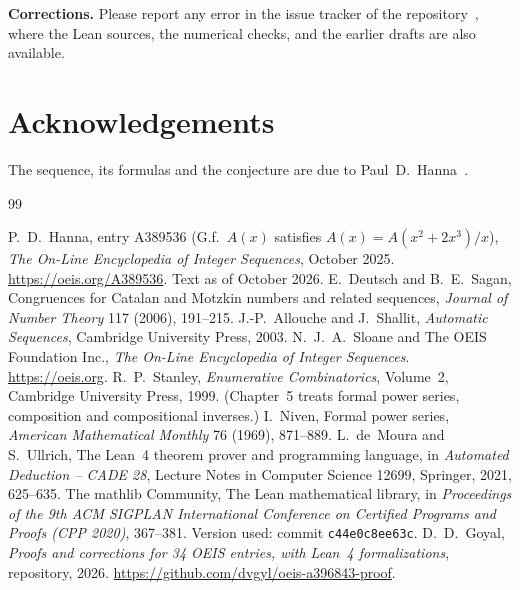 \documentclass[11pt,a4paper]{article}
\theoremstyle{definition}
\theoremstyle{remark}
\newcommand{\para}[1]{\par\medskip\noindent\textbf{#1}\enspace}
\begin{document}
\para{Corrections.} Please report any error in the issue tracker of the repository~\cite{repo}, where the Lean
sources, the numerical checks, and the earlier drafts are also available.

\section*{Acknowledgements}
The sequence, its formulas and the conjecture are due to Paul~D.~Hanna~\cite{oeis}.

\begin{thebibliography}{99}\small
\raggedright
{} P.~D.~Hanna, entry A389536 (G.f.\ $A(x)$ satisfies $A(x)=A(x^2+2x^3)/x$), \emph{The On-Line Encyclopedia of Integer Sequences}, October 2025. \url{https://oeis.org/A389536}. Text as of October 2026.
 E.~Deutsch and B.~E.~Sagan, Congruences for Catalan and Motzkin numbers and related sequences, \emph{Journal of Number Theory} 117 (2006), 191--215.
 J.-P.~Allouche and J.~Shallit, \emph{Automatic Sequences}, Cambridge University Press, 2003.
 N.~J.~A.~Sloane and The OEIS Foundation Inc., \emph{The On-Line Encyclopedia of Integer Sequences}. \url{https://oeis.org}.
 R.~P.~Stanley, \emph{Enumerative Combinatorics}, Volume~2, Cambridge University Press, 1999. (Chapter~5 treats formal power series, composition and compositional inverses.)
 I.~Niven, Formal power series, \emph{American Mathematical Monthly} 76 (1969), 871--889.
 L.~de~Moura and S.~Ullrich, The Lean~4 theorem prover and programming language, in \emph{Automated Deduction -- CADE 28}, Lecture Notes in Computer Science 12699, Springer, 2021, 625--635.
 The mathlib Community, The Lean mathematical library, in \emph{Proceedings of the 9th ACM SIGPLAN International Conference on Certified Programs and Proofs (CPP 2020)}, 367--381. Version used: commit \texttt{c44e0c8ee63c}.
 D.~D.~Goyal, \emph{Proofs and corrections for 34 OEIS entries, with Lean~4 formalizations}, repository, 2026. \url{https://github.com/dvgyl/oeis-a396843-proof}.
\end{thebibliography}
\end{document}
